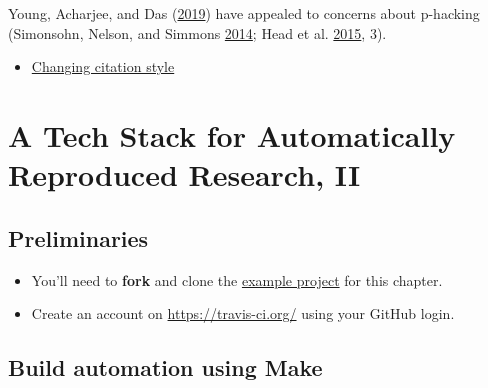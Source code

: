 \documentclass[
]{article}
\providecommand{\tightlist}{%
  \setlength{\itemsep}{0pt}\setlength{\parskip}{0pt}}
\begin{document}
Young, Acharjee, and Das (\protect\hyperlink{ref-YoungReliabilityEnvironmentalEpidemiology2019}{2019}) have appealed to concerns about p-hacking (Simonsohn, Nelson, and Simmons \protect\hyperlink{ref-SimonsohnPcurveKeyFiledrawer2014}{2014}; Head et al. \protect\hyperlink{ref-HeadExtentConsequencesPHacking2015}{2015}, 3).

\begin{itemize}
\tightlist
\item
  \href{https://bookdown.org/yihui/rmarkdown-cookbook/bibliography.html\#changing-citation-style}{Changing citation style}
\end{itemize}

\hypertarget{a-tech-stack-for-automatically-reproduced-research-ii}{%
\section{A Tech Stack for Automatically Reproduced Research, II}\label{a-tech-stack-for-automatically-reproduced-research-ii}}

\hypertarget{preliminaries}{%
\subsection{Preliminaries}\label{preliminaries}}

\begin{itemize}
\tightlist
\item
  You'll need to \textbf{fork} and clone the \href{https://GitHub.com/data-science-methods/repro_ex}{example project} for this chapter.
\item
  Create an account on \url{https://travis-ci.org/} using your GitHub login.
\end{itemize}

\hypertarget{build-automation-using-make}{%
\subsection{Build automation using Make}\label{build-automation-using-make}}
\end{document}
